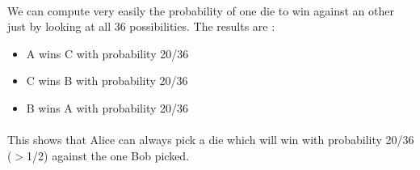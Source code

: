 \paragraph{} 
We can compute very easily the probability of one die to win against an other just by looking at all 36 possibilities. The results are :
\begin{itemize}
\item A wins C with probability 20/36
\item C wins B with probability 20/36
\item B wins A with probability 20/36
\end{itemize}

\paragraph{}
This shows that Alice can always pick a die which will win with probability 20/36 ($>$1/2) against the one Bob picked.
